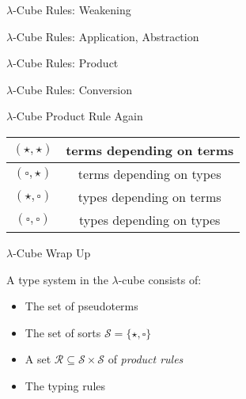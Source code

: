 \documentclass{beamer}
\begin{document}
\begin{frame}{$\lambda$-Cube Rules: Weakening}



\end{frame}


\begin{frame}{$\lambda$-Cube Rules: Application, Abstraction}



\end{frame}


\begin{frame}{$\lambda$-Cube Rules: Product}



\end{frame}


\begin{frame}{$\lambda$-Cube Rules: Conversion}



\end{frame}


\begin{frame}{$\lambda$-Cube Product Rule Again}


  \begin{center}
    \begin{tabular}{|c|c|}
    \hline
    $(\star, \star)$ & terms depending on terms \\
    \hline
    $(\square, \star)$ & terms depending on types \\
    \hline
    $(\star, \square)$ & types depending on terms \\
    \hline
    $(\square, \square)$ & types depending on types \\
    \hline
    \end{tabular}
  \end{center}

\end{frame}

\begin{frame}{$\lambda$-Cube Wrap Up}

  A type system in the $\lambda$-cube consists of:

  \begin{itemize}
    \item
      The set of pseudoterms
    \item
      The set of sorts $\mathcal{S} = \{\star, \square\}$
    \item
      A set $\mathcal{R} \subseteq \mathcal{S} \times \mathcal{S}$ of \emph{product rules}
    \item
      The typing rules
  \end{itemize}

\end{frame}
\end{document}
